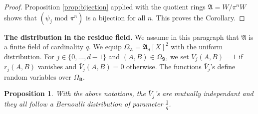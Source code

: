 \documentclass{jT}
\numberwithin{equation}{section}
\newtheorem{prop}[theo]{Proposition}
\theoremstyle{definition}
\newcommand{\ring}{\mathfrak A}
\newcommand{\A}{W}
\begin{document}
\begin{proof}
Proposition \ref{prop:bijection} applied with the quotient rings $\ring 
= \A/\pi^n\A$ shows that $(\psi_j \text{ mod } \pi^n)$ is a bijection 
for all $n$. This proves the Corollary.
\end{proof}

\noindent 
\textbf{The distribution in the residue field.}
We assume in this paragraph that $\ring$ is a finite field of 
cardinality $q$. We equip $\Omega_\ring = \ring_d[X]^2$ with the uniform 
distribution. For $j \in \{0, \ldots, d-1\}$ and $(A,B) \in \Omega_\ring$,
we set $\bar V_j(A,B) = 1$ if $r_j(A,B)$ vanishes and $\bar V_j(A,B) = 0$
otherwise. The functions $\bar V_j$'s define random variables over 
$\Omega_\ring$.

\begin{prop}
\label{prop:distribk}
With the above notations, the $\bar V_j$'s are mutually independant
and they all follow a Bernoulli distribution of parameter $\frac 1 q$.
\end{prop}
\end{document}
